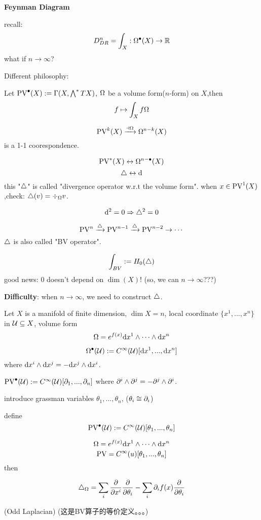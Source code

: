 

\textbf{Feynman Diagram}

recall:
$$D^n_{DR}=\int_X:\Omega^{\bullet}(X)\to\mathbb{R}$$
what if $n\to \infty$?

Different philosophy:

Let $\operatorname{PV}^{\bullet}(X):=\Gamma(X,\bigwedge\nolimits^{*}TX)$,
$\Omega$ be a volume form($n$-form) on $X$,then
$$f\mapsto\int_Xf\Omega$$

$$\operatorname{PV}^k(X)\xrightarrow{\dashv\Omega}\Omega^{n-k}(X)$$
is a 1-1 coorespondence.

$$\operatorname{PV}^*(X)\leftrightarrow \Omega^{n-\bullet}(X)$$
$$\triangle\leftrightarrow \mathrm{d}$$
this "$\triangle$" is called "divergence operator w.r.t the volume form".
when $x\in\operatorname{PV}^1(X)$,check: $\triangle(v)=\div_{\Omega}v$.

$$\mathrm{d}^2=0\Rightarrow\triangle^2=0$$

$$\operatorname{PV}^n\xrightarrow{\triangle}\operatorname{PV}^{n-1}\xrightarrow{\triangle}\operatorname{PV}^{n-2}\to\cdots$$
$\triangle$ is also called "BV operator".

$$\int_{BV}:=H_0(\triangle)$$
good news: $0$ doesn't depend on $\dim(X)$!
(so, we can $n\to\infty$???)

\textbf{Difficulty}: when $n\to\infty$, we need to construct $\triangle$.

\begin{example}
Let $X$ is a manifold of finite dimension, $\dim X=n$, 
local coordinate $\{x^1,...,x^n\}$ in $\mathcal{U}\subseteq X$, 
volume form
$$\Omega=e^{f(x)}\mathrm{d} x^1\wedge\cdots\wedge\mathrm{d} x^n$$

$$\Omega^{\bullet}(\mathcal{U}):=C^{\infty}(\mathcal{U})[\mathrm{d} x^1,...,\mathrm{d} x^n]$$
where $\mathrm{d} x^i\wedge\mathrm{d} x^j=-\mathrm{d} x^j\wedge\mathrm{d} x^i$.

$\operatorname{PV}^{\bullet}(\mathcal{U}):=C^{\infty}(\mathcal{U})[\partial_1,...,\partial_n]$
 where $\partial^i\wedge\partial^j=-\partial^j\wedge\partial^i$.
\end{example}

introduce grassman variables $\theta_1,...,\theta_n$,
($\theta _i\cong \partial_i$)

define 
$$\operatorname{PV}^{\bullet}(\mathcal{U}):=C^{\infty}(\mathcal{U})[\theta_1,...,\theta_n]$$


\begin{prop}
$$\Omega=e^{f(x)}\mathrm{d} x^1\wedge\cdots\wedge \mathrm{d} x^n$$
$$\operatorname{PV}=C^{\infty}(u)[\theta_1,...,\theta_n]$$
then

$$\triangle_{\Omega}=\sum_{i}\frac{\partial } {\partial x^i}\frac{\partial } {\partial \theta_i}
-\sum_{i}\partial_if(x)\frac{\partial } {\partial \theta_i}$$

(Odd Laplacian)
(这是BV算子的等价定义。。。)
\end{prop}

